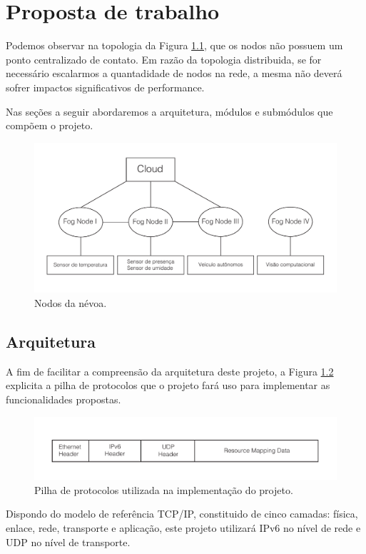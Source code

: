 \chapter{\label{chap:chap3} Proposta de trabalho}


Podemos observar na topologia da Figura \ref{fig:fig1}, que os nodos não possuem um ponto centralizado de contato.
Em razão da topologia distribuida, se for necessário escalarmos a quantadidade de nodos na rede, a mesma não deverá sofrer impactos significativos de performance.

Nas seções a seguir abordaremos a arquitetura, módulos e submódulos que compõem o projeto.


\begin{figure}[htb!]
    \centering\includegraphics[width=.75\textwidth]{fig1.pdf}
    \caption%
    {\label{fig:fig1} Nodos da névoa.}
\end{figure}

\section{Arquitetura}

A fim de facilitar a compreensão da arquitetura deste projeto, a Figura \ref{fig:fig2} explicita a pilha de protocolos que o projeto fará uso para implementar as funcionalidades propostas.

\begin{figure}[htb!]
    \centering\includegraphics[width=.75\textwidth]{fig2.pdf}
    \caption%
    {\label{fig:fig2} Pilha de protocolos utilizada na implementação do projeto.}
\end{figure}

Dispondo do modelo de referência TCP/IP\cite{tanenbaum2011redes}, constituido de cinco camadas: física, enlace, rede, transporte e aplicação, este projeto utilizará IPv6 no nível de rede e UDP no nível de transporte.

